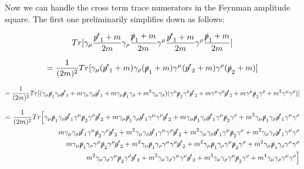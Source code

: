\documentclass[a4]{article}
\begin{document}
    Now we can handle the cross term trace numerators in the Feynman amplitude square. The first one preliminarily simplifies down as follows:

    \begin{equation}
        Tr [\gamma_\mu \frac{\slashed{p'}_1 + m}{2m} \gamma_\rho \frac{\slashed{p}_1 + m}{2 m} \gamma^\mu \frac{\slashed{p'}_1 + m}{2m} \gamma^\rho \frac{\slashed{p}_1 + m}{2 m}]
    \end{equation}

    \begin{equation}
        = \frac{1}{(2 m)^2} Tr [\gamma_\mu (\slashed{p'}_1 + m) \gamma_\rho (\slashed{p}_1 + m) \gamma^\mu (\slashed{p'}_2 + m) \gamma^\rho (\slashed{p}_2 + m)]
    \end{equation}

    \begin{equation}
        = \frac{1}{(2 m)^2} Tr [(\gamma_\mu \slashed{p}_1 \gamma_\rho \slashed{p'}_1 + m \gamma_\mu \gamma_\rho \slashed{p'}_1 + m \gamma_\mu \slashed{p}_1 \gamma_\rho + m^2 \gamma_\mu \gamma_\rho) (\gamma^\mu \slashed{p}_2 \gamma^\rho \slashed{p'}_2 + m \gamma^\mu \gamma^\rho \slashed{p'}_2 + m \gamma^\mu \slashed{p}_2 \gamma^\rho + m^2 \gamma^\mu \gamma^\rho)]
    \end{equation}

    \begin{eqnarray}
        = \frac{1}{(2 m)^2} Tr \Big[ \gamma_\mu \slashed{p}_1 \gamma_\rho \slashed{p'}_1 \gamma^\mu \slashed{p}_2 \gamma^\rho \slashed{p'}_2 + m \gamma_\mu \slashed{p}_1 \gamma_\rho \slashed{p'}_1 \gamma^\mu \gamma^\rho \slashed{p'}_2 + m \gamma_\mu \slashed{p}_1 \gamma_\rho \slashed{p'}_1 \gamma^\mu \slashed{p}_2 \gamma^\rho + m^2 \gamma_\mu \slashed{p}_1 \gamma_\rho \slashed{p'}_1 \gamma^\mu \gamma^\rho \\
        m \gamma_\mu \gamma_\rho \slashed{p'}_1 \gamma^\mu \slashed{p}_2 \gamma^\rho \slashed{p'}_2 + m^2 \gamma_\mu \gamma_\rho \slashed{p'}_1 \gamma^\mu \gamma^\rho \slashed{p'}_2 + m^2 \gamma_\mu \gamma_\rho \slashed{p'}_1 \gamma^\mu \slashed{p}_2 \gamma^\rho + m^2 \gamma_\mu \gamma_\rho \slashed{p'}_1 \gamma^\mu \gamma^\rho \\
        m \gamma_\mu \slashed{p}_1 \gamma_\rho \gamma^\mu \slashed{p}_2 \gamma^\rho \slashed{p'}_2 + m^2 \gamma_\mu \slashed{p}_1 \gamma_\rho \gamma^\mu \gamma^\rho \slashed{p'}_2 + m^2 \gamma_\mu \slashed{p}_1 \gamma_\rho \gamma^\mu \slashed{p}_2 \gamma^\rho + m^2 \gamma_\mu \slashed{p}_1 \gamma_\rho \gamma^\mu \gamma^\rho \\
        m^2 \gamma_\mu \gamma_\rho \gamma^\mu \slashed{p}_2 \gamma^\rho \slashed{p'}_2 + m^3 \gamma_\mu \gamma_\rho \gamma^\mu \gamma^\rho \slashed{p'}_2 + m^3 \gamma_\mu \gamma_\rho \gamma^\mu \slashed{p}_2 \gamma^\rho + m^4 \gamma_\mu \gamma_\rho \gamma^\mu \gamma^\rho \Big]
    \end{eqnarray}
\end{document}
